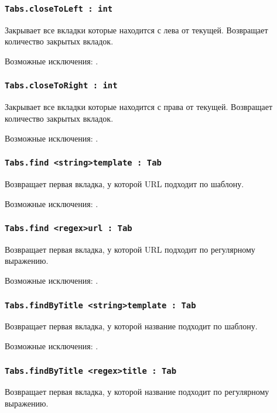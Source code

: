 \subsubsection{\lstinline|Tabs.closeToLeft : int|}

Закрывает все вкладки которые находится с лева от текущей. Возвращает количество закрытых вкладок.

Возможные исключения: .

\subsubsection{\lstinline|Tabs.closeToRight : int|}

Закрывает все вкладки которые находится с права от текущей. Возвращает количество закрытых вкладок.

Возможные исключения: .

\subsubsection{\lstinline|Tabs.find <string>template : Tab|}

Возвращает первая вкладка, у которой URL подходит по шаблону.

Возможные исключения: .

\subsubsection{\lstinline|Tabs.find <regex>url : Tab|}

Возвращает первая вкладка, у которой URL подходит по регулярному выражению.

Возможные исключения: .

\subsubsection{\lstinline|Tabs.findByTitle <string>template : Tab|}

Возвращает первая вкладка, у которой название подходит по шаблону.

Возможные исключения: .

\subsubsection{\lstinline|Tabs.findByTitle <regex>title : Tab|}

Возвращает первая вкладка, у которой название подходит по регулярному выражению.

